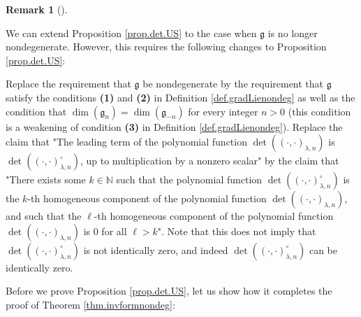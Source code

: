 \documentclass
[numbers=enddot,12pt,final,onecolumn,german,notitlepage]{scrartcl}%
\theoremstyle{definition}
\newtheorem{remk}[theo]{Remark}
\newenvironment{remark}[1][]
{\begin{remk}[#1]\begin{leftbar}}
{\end{leftbar}\end{remk}}
\begin{document}
\begin{remark}
We can extend Proposition \ref{prop.det.US} to the case when $\mathfrak{g}$ is
no longer nondegenerate. However, this requires the following changes to
Proposition \ref{prop.det.US}:

Replace the requirement that $\mathfrak{g}$ be nondegenerate by the
requirement that $\mathfrak{g}$ satisfy the conditions \textbf{(1)} and
\textbf{(2)} in Definition \ref{def.gradLienondeg} as well as the condition
that $\dim\left(  \mathfrak{g}_{n}\right)  =\dim\left(  \mathfrak{g}%
_{-n}\right)  $ for every integer $n>0$ (this condition is a weakening of
condition \textbf{(3)} in Definition \ref{def.gradLienondeg}). Replace the
claim that "The leading term of the polynomial function $\det\left(  \left(
\cdot,\cdot\right)  _{\lambda,n}\right)  $ is $\det\left(  \left(  \cdot
,\cdot\right)  _{\lambda,n}^{\circ}\right)  $, up to multiplication by a
nonzero scalar" by the claim that "There exists some $k\in\mathbb{N}$ such
that the polynomial function $\det\left(  \left(  \cdot,\cdot\right)
_{\lambda,n}^{\circ}\right)  $ is the $k$-th homogeneous component of the
polynomial function $\det\left(  \left(  \cdot,\cdot\right)  _{\lambda
,n}\right)  $, and such that the $\ell$-th homogeneous component of the
polynomial function $\det\left(  \left(  \cdot,\cdot\right)  _{\lambda
,n}\right)  $ is $0$ for all $\ell>k$". Note that this does not imply that
$\det\left(  \left(  \cdot,\cdot\right)  _{\lambda,n}^{\circ}\right)  $ is not
identically zero, and indeed $\det\left(  \left(  \cdot,\cdot\right)
_{\lambda,n}^{\circ}\right)  $ can be identically zero.
\end{remark}

Before we prove Proposition \ref{prop.det.US}, let us show how it completes
the proof of Theorem \ref{thm.invformnondeg}:
\end{document}
